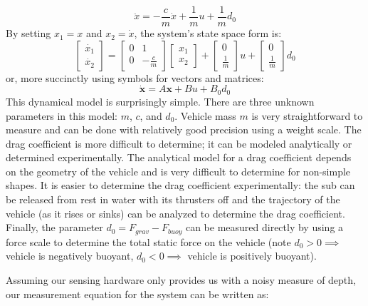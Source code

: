 \documentclass{article}
\begin{document}
\begin{equation}
\ddot{x}=-\frac{c}{m}\dot{x}+\frac{1}{m}u+\frac{1}{m}d_0
\end{equation}
By setting $x_1=x$ and $x_2=\dot{x}$, the system's state space form is:
\begin{equation*}%
\begin{bmatrix} \dot{x_1} \\ \dot{x_2} \end{bmatrix}=\begin{bmatrix} 0 & 1 \\ 0 & -\frac{c}{m} \end{bmatrix} \begin{bmatrix} x_1 \\ x_2 \end{bmatrix} + \begin{bmatrix} 0 \\ \frac{1}{m} \end{bmatrix}u + \begin{bmatrix} 0 \\ \frac{1}{m} \end{bmatrix}d_0
\end{equation*}
or, more succinctly using symbols for vectors and matrices:
\begin{equation}
\label{eq:system}
\pmb{\dot{x}}=A\pmb{x}+Bu+B_0d_0
\end{equation}
This dynamical model is surprisingly simple.  There are three unknown parameters in this model: $m$, $c$, and $d_0$.  Vehicle mass $m$ is very straightforward to measure and can be done with relatively good precision using a weight scale.  The drag coefficient is more difficult to determine; it can be modeled analytically or determined experimentally.  The analytical model for a drag coefficient depends on the geometry of the vehicle and is very difficult to determine for non-simple shapes.  It is easier to determine the drag coefficient experimentally: the sub can be released from rest in water with its thrusters off and the trajectory of the vehicle (as it rises or sinks) can be analyzed to determine the drag coefficient.  Finally, the parameter $d_0=F_{grav}-F_{buoy}$ can be measured directly by using a force scale to determine   the total static force on the vehicle (note $d_0>0 \implies$ vehicle is negatively buoyant, $d_0<0 \implies$ vehicle is positively buoyant). 

Assuming our sensing hardware only provides us with a noisy measure of depth, our measurement equation for the system can be written as:
\end{document}
